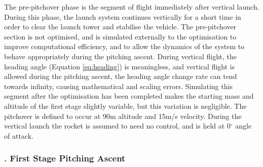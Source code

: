  The pre-pitchover phase is the segment of flight immediately after vertical launch. During this phase, the launch system continues vertically for a short time in order to clear the launch tower and stabilise the vehicle.        
The pre-pitchover section is not optimised, and is simulated externally to the optimisation to improve computational efficiency, and to allow the dynamics of the system to behave appropriately during the pitching ascent. During vertical flight, the heading angle (Equation \ref{eq:heading}) is meaningless, and vertical flight is allowed during the pitching ascent, the heading angle change rate can tend towards infinity, causing mathematical and scaling errors. Simulating this segment after the optimisation has been completed makes the starting mass and altitude of the first stage slightly variable, but this variation is negligible. 
The pitchover is defined to occur at 90m altitude and 15m/s velocity.
During the vertical launch the rocket is assumed to need no control, and is held at 0$^\circ$ angle of attack. 

\subsubsection{\textcolor{red}{.} First Stage Pitching Ascent}

